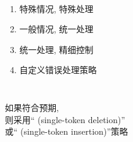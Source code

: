 \begin{frame}
  \begin{center}
     \\[10pt]
  \end{center}

  \begin{columns}
      \begin{enumerate}[(1)]
        \setlength{\itemsep}{10pt}
        \item 特殊情况, 特殊处理
        \item 一般情况, 统一处理
        \item 统一处理, 精细控制
        \item 自定义错误处理策略
      \end{enumerate}
  \end{columns}
\end{frame}

\begin{frame}{}
  \begin{center}

    \vspace{0.80cm}
    如果符合预期, \\[10pt]
    则采用`` (single-token deletion)'' \\[10pt]
    或`` (single-token insertion)''策略

    \vspace{1.00cm}
  \end{center}
\end{frame}

\begin{frame}{}
  \begin{center}

    \vspace{0.50cm}
  \end{center}
\end{frame}

\begin{frame}{}
  \begin{center}

    \vspace{0.50cm}
  \end{center}
\end{frame}

